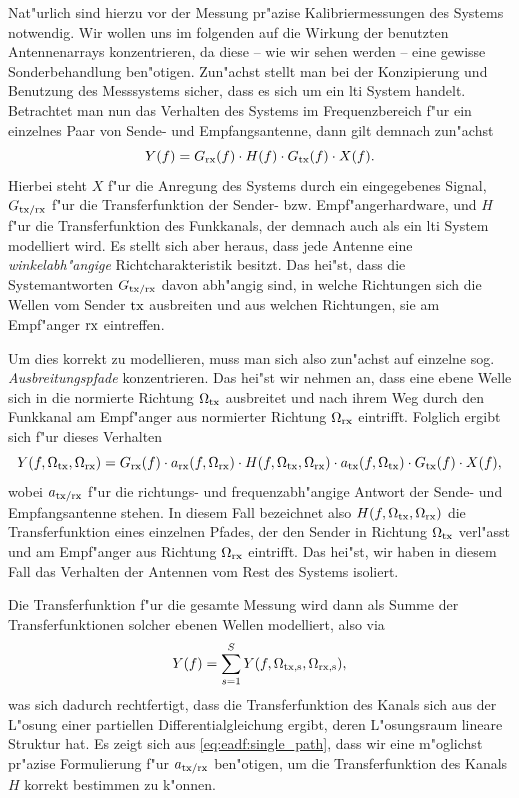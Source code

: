 Nat"urlich sind hierzu vor der Messung pr"azise Kalibriermessungen des Systems notwendig.
Wir wollen uns im folgenden auf die Wirkung der benutzten Antennenarrays konzentrieren, da diese -- wie wir sehen werden -- eine gewisse Sonderbehandlung ben"otigen.
Zun"achst stellt man bei der Konzipierung und Benutzung des Messsystems sicher, dass es sich um ein \gls{lti} System handelt.
Betrachtet man nun das Verhalten des Systems im Frequenzbereich f"ur ein einzelnes Paar von Sende- und Empfangsantenne, dann gilt demnach zun"achst
\begin{equation}
    Y(f) = G_{\rm rx}(f) \cdot H(f) \cdot G_{\rm tx}(f) \cdot X(f).
\end{equation}
Hierbei steht $X$ f"ur die Anregung des Systems durch ein eingegebenes Signal, $G_{\rm tx/\rm rx}$ f"ur die Transferfunktion der Sender- bzw. Empf"angerhardware, und $H$ f"ur die Transferfunktion des Funkkanals, der demnach auch als ein \gls{lti} System modelliert wird.
Es stellt sich aber heraus, dass jede Antenne eine \emph{winkelabh"angige} Richtcharakteristik besitzt.
Das hei"st, dass die Systemantworten $G_{\rm tx/\rm rx}$ davon abh"angig sind, in welche Richtungen sich die Wellen vom Sender $\rm tx$ ausbreiten und aus welchen Richtungen, sie am Empf"anger $\rm rx$ eintreffen. 

Um dies korrekt zu modellieren, muss man sich also zun"achst auf einzelne sog. \emph{Ausbreitungspfade} konzentrieren.
Das hei"st wir nehmen an, dass eine ebene Welle sich in die normierte Richtung $\Omega_{\rm tx}$ ausbreitet und nach ihrem Weg durch den Funkkanal am Empf"anger aus normierter Richtung $\Omega_{\rm rx}$ eintrifft. 
Folglich ergibt sich f"ur dieses Verhalten
\begin{equation}\label{eq:eadf:single_path}
    Y(f, \Omega_{\rm tx}, \Omega_{\rm rx}) = 
        G_{\rm rx}(f) \cdot a_{\rm rx}(f, \Omega_{\rm rx})
        \cdot H(f, \Omega_{\rm tx}, \Omega_{\rm rx}) 
        \cdot a_{\rm tx}(f, \Omega_{\rm tx}) \cdot G_{\rm tx}(f)
        \cdot X(f),
\end{equation}
%
wobei $a_{\rm tx/\rm rx}$ f"ur die richtungs- und frequenzabh"angige Antwort der Sende- und Empfangsantenne stehen.
In diesem Fall bezeichnet also $H(f, \Omega_{\rm tx}, \Omega_{\rm rx})$ die Transferfunktion eines einzelnen Pfades, der den Sender in Richtung $\Omega_{\rm tx}$ verl"asst und am Empf"anger aus Richtung $\Omega_{\rm rx}$ eintrifft.
Das hei"st, wir haben in diesem Fall das Verhalten der Antennen vom Rest des Systems isoliert. 

Die Transferfunktion f"ur die gesamte Messung wird dann als Summe der Transferfunktionen solcher ebenen Wellen modelliert, also via
\begin{equation}
    Y(f) = {\sum\limits_{s = 1}^{S}{
        Y(f, \Omega_{\rm tx,s}, \Omega_{\rm rx,s})
    }},
\end{equation}
was sich dadurch rechtfertigt, dass die Transferfunktion des Kanals sich aus der L"osung einer partiellen Differentialgleichung ergibt, deren L"osungsraum lineare Struktur hat.
Es zeigt sich aus \eqref{eq:eadf:single_path}, dass wir eine m"oglichst pr"azise Formulierung f"ur $a_{\rm tx/\rm rx}$ ben"otigen, um die Transferfunktion des Kanals $H$ korrekt bestimmen zu k"onnen.
%
%
%
